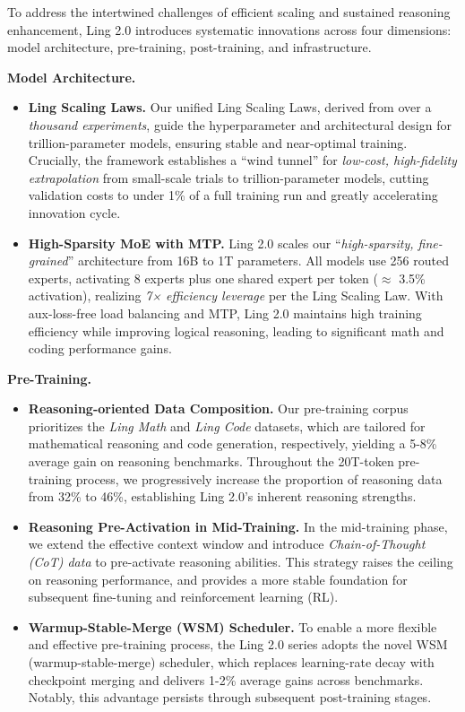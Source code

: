 \documentclass[table]{gtech}
\theoremstyle{definition}
\newcommand{\paratitle}[1]{\vspace{1.5ex}\noindent\textbf{#1}}
\begin{document}
To address the intertwined challenges of efficient scaling and sustained reasoning enhancement, Ling 2.0 introduces systematic innovations across four dimensions: model architecture, pre-training, post-training, and infrastructure.

\paratitle{Model Architecture.} 
\begin{itemize}
  \item \textbf{Ling Scaling Laws.} 
  Our unified Ling Scaling Laws, derived from over a \textit{thousand experiments}, guide the hyperparameter and architectural design for trillion-parameter models, ensuring stable and near-optimal training. Crucially, the framework establishes a ``wind tunnel'' for \textit{low-cost, high-fidelity extrapolation} from small-scale trials to trillion-parameter models, cutting validation costs to under 1\% of a full training run and greatly accelerating innovation cycle.
  
  \item \textbf{High-Sparsity MoE with MTP.} 
  Ling 2.0 scales our ``\textit{high-sparsity, fine-grained}'' architecture from 16B to 1T parameters. All models use 256 routed experts, activating 8 experts plus one shared expert per token ($\approx$ 3.5\% activation), realizing \textit{7× efficiency leverage} per the Ling Scaling Law. With aux-loss-free load balancing and MTP, Ling 2.0 maintains high training efficiency while improving logical reasoning, leading to significant math and coding performance gains.
  
\end{itemize}

\paratitle{Pre-Training.} 
\begin{itemize}
  \item \textbf{Reasoning-oriented Data Composition.} 
  Our pre-training corpus prioritizes the \textit{Ling Math} and \textit{Ling Code} datasets, which are tailored for mathematical reasoning and code generation, respectively, yielding a 5-8\% average gain on reasoning benchmarks. Throughout the 20T-token pre-training process, we progressively increase the proportion of reasoning data from 32\% to 46\%, establishing Ling 2.0's inherent reasoning strengths.
    
  \item \textbf{Reasoning Pre-Activation in Mid-Training.} 
  In the mid-training phase, we extend the effective context window and introduce \textit{Chain-of-Thought (CoT) data} to pre-activate reasoning abilities. This strategy raises the ceiling on reasoning performance, and provides a more stable foundation for subsequent fine-tuning and reinforcement learning (RL). 
  
  \item \textbf{Warmup-Stable-Merge (WSM) Scheduler.} 
  To enable a more flexible and effective pre-training process, the Ling 2.0 series adopts the novel WSM (warmup-stable-merge) scheduler, which replaces learning-rate decay with checkpoint merging and delivers 1-2\% average gains across benchmarks. Notably, this advantage persists through subsequent post-training stages. 
\end{itemize}
\end{document}
